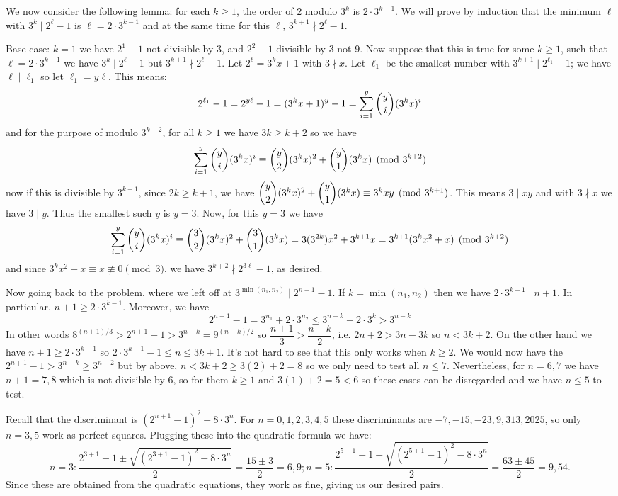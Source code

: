 \documentclass[12pt]{article}
\newcommand{\<}{\langle}
\renewcommand{\>}{\rangle}
\begin{document}
\begin{enumerate}
	We now consider the following lemma: for each $k\ge 1$, the order of $2$ modulo $3^k$ is $2\cdot 3^{k-1}$. We will prove by induction that the minimum $\ell$ with $3^k\mid 2^{\ell}-1$ is $\ell=2\cdot 3^{k-1}$ and at the same time for this $\ell$, $3^{k+1}\nmid 2^{\ell}-1$. 
	
	Base case: $k=1$ we have $2^1-1$ not divisible by 3, and $2^2-1$ divisible by 3 not 9. Now suppose that this is true for some $k\ge 1$, such that $\ell=2\cdot 3^{k-1}$ we have $3^k\mid 2^{\ell}-1$ but $3^{k+1}\nmid 2^{\ell}-1$. Let $2^{\ell}=3^kx+1$ with $3\nmid x$. Let $\ell_1$ be the smallest number with $3^{k+1}\mid 2^{\ell_1}-1$; we have $\ell\mid \ell_1$ so let $\ell_1=y\ell$. This means: 
	\[
	2^{\ell_1}-1 = 2^{y\ell}-1=(3^kx+1)^y-1 = \displaystyle\sum_{i=1}^y \dbinom{y}{i}(3^kx)^i
	\]
	and for the purpose of modulo $3^{k+2}$, for all $k\ge 1$ we have $3k\ge k+2$ so we have 
	\[
	\displaystyle\sum_{i=1}^y \dbinom{y}{i}(3^kx)^i\equiv 
	\dbinom{y}{2}(3^kx)^2 + \dbinom{y}{1}(3^kx)
	\pmod{3^{k+2}}
	\]
	now if this is divisible by $3^{k+1}$, since $2k\ge k+1$, we have $\dbinom{y}{2}(3^kx)^2 + \dbinom{y}{1}(3^kx)\equiv 3^kxy\pmod{3^{k+1}}$. This means $3\mid xy$ and with $3\nmid x$ we have $3\mid y$. Thus the smallest such $y$ is $y=3$. Now, for this $y=3$ we have 
	\[
	\displaystyle\sum_{i=1}^y \dbinom{y}{i}(3^kx)^i\equiv 
	\dbinom{3}{2}(3^kx)^2 + \dbinom{3}{1}(3^kx)
	=3(3^{2k})x^2+3^{k+1}x
	=3^{k+1}(3^kx^2+x)
	\pmod{3^{k+2}}
	\]
	and since $3^kx^2+x\equiv x\not\equiv 0\pmod{3}$, we have $3^{k+2}\nmid 2^{3\ell}-1$, as desired. 
	
	Now going back to the problem, where we left off at $3^{\min(n_1, n_2)}\mid 2^{n+1}-1$. If $k=\min(n_1, n_2)$ then we have $2\cdot 3^{k-1}\mid n+1$. In particular, $n+1\ge 2\cdot 3^{k-1}$.  Moreover, we have 
	\[2^{n+1}-1= 3^{n_1}+2\cdot 3^{n_2}\le 3^{n-k}+2\cdot 3^k > 3^{n-k}
	\]
	In other words $8^{(n+1)/3}>2^{n+1}-1 > 3^{n-k}=9^{(n-k)/2}$ so $\dfrac{n+1}{3}> \dfrac{n-k}{2}$, i.e. $2n+2> 3n-3k$ so $n<3k+2$. On the other hand we have $n+1\ge 2\cdot 3^{k-1}$ so $2\cdot 3^{k-1} -1 \le n\le 3k+1$. It's not hard to see that this only works when $k\ge 2$. We would now have the $2^{n+1}-1>3^{n-k}\ge 3^{n-2}$ but by above, $n<3k+2\ge 3(2)+2=8$ so we only need to test all $n\le 7$. Nevertheless, for $n=6, 7$ we have $n+1=7, 8$ which is not divisible by 6, so for them $k\ge 1$ and $3(1)+2=5<6$ so these cases can be disregarded and we have $n\le 5$ to test. 
	
	Recall that the discriminant is $(2^{n+1}-1)^2-8\cdot 3^n$. For $n=0, 1, 2, 3, 4, 5$ these discriminants are $-7, -15, -23, 9, 313, 2025$, so only $n=3, 5$ work as perfect squares. Plugging these into the quadratic formula we have: 
	\[
	n=3: \dfrac{2^{3+1}-1 \pm \sqrt{(2^{3+1}-1)^2 - 8\cdot 3^n}}{2} = \dfrac{15\pm 3}{2}=6, 9;
	n = 5: \dfrac{2^{5+1}-1 \pm \sqrt{(2^{5+1}-1)^2 - 8\cdot 3^n}}{2} = \dfrac{63\pm 45}{2} = 9, 54. 
	\]
	Since these are obtained from the quadratic equations, they work as fine, giving us our desired pairs. 
	

\end{enumerate}
\end{document}
